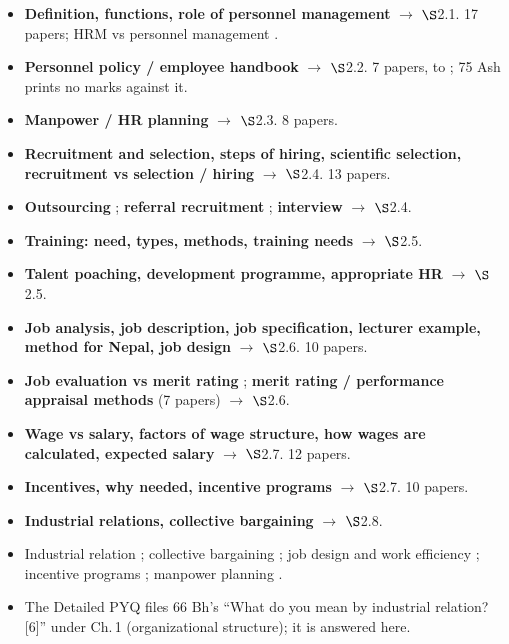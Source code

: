 \begin{itemize}
  \item \textbf{Definition, functions, role of personnel management} $\rightarrow$ $\S$2.1.
    17 papers; HRM vs personnel management .
  \item \textbf{Personnel policy / employee handbook} $\rightarrow$ $\S$2.2. 7 papers,
     to ; 75 Ash prints no marks against it.
  \item \textbf{Manpower / HR planning} $\rightarrow$ $\S$2.3. 8 papers.
  \item \textbf{Recruitment and selection, steps of hiring, scientific selection,
    recruitment vs selection / hiring} $\rightarrow$ $\S$2.4. 13 papers.
  \item \textbf{Outsourcing} ; \textbf{referral recruitment}
    ; \textbf{interview}  $\rightarrow$ $\S$2.4.
  \item \textbf{Training: need, types, methods, training needs} $\rightarrow$ $\S$2.5.
  \item \textbf{Talent poaching, development programme, appropriate HR}  $\rightarrow$ $\S$2.5.
  \item \textbf{Job analysis, job description, job specification, lecturer example, method
    for Nepal, job design} $\rightarrow$ $\S$2.6. 10 papers.
  \item \textbf{Job evaluation vs merit rating} ;
    \textbf{merit rating / performance appraisal methods} (7 papers) $\rightarrow$ $\S$2.6.
  \item \textbf{Wage vs salary, factors of wage structure, how wages are calculated, expected
    salary} $\rightarrow$ $\S$2.7. 12 papers.
  \item \textbf{Incentives, why needed, incentive programs} $\rightarrow$ $\S$2.7. 10 papers.
  \item \textbf{Industrial relations, collective bargaining} $\rightarrow$ $\S$2.8.
\end{itemize}

\begin{itemize}
  \item Industrial relation ; collective bargaining ; job
    design and work efficiency ; incentive programs ; manpower
    planning .
  \item The Detailed PYQ files 66 Bh's ``What do you mean by industrial relation? [6]'' under
    Ch.\,1 (organizational structure); it is answered here.
\end{itemize}

